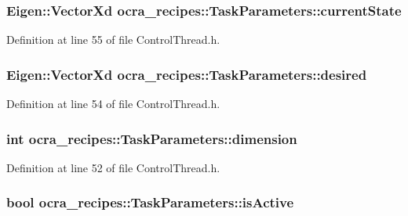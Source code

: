 \subsubsection[{\texorpdfstring{current\+State}{currentState}}]{\setlength{\rightskip}{0pt plus 5cm}Eigen\+::\+Vector\+Xd ocra\+\_\+recipes\+::\+Task\+Parameters\+::current\+State}\hypertarget{classocra__recipes_1_1TaskParameters_a323bf15f03055fcbf07f865ba9074381}{}\label{classocra__recipes_1_1TaskParameters_a323bf15f03055fcbf07f865ba9074381}


Definition at line 55 of file Control\+Thread.\+h.

\subsubsection[{\texorpdfstring{desired}{desired}}]{\setlength{\rightskip}{0pt plus 5cm}Eigen\+::\+Vector\+Xd ocra\+\_\+recipes\+::\+Task\+Parameters\+::desired}\hypertarget{classocra__recipes_1_1TaskParameters_a1dbe7dbb189079f4c8b7cd8f60a3b33e}{}\label{classocra__recipes_1_1TaskParameters_a1dbe7dbb189079f4c8b7cd8f60a3b33e}


Definition at line 54 of file Control\+Thread.\+h.

\subsubsection[{\texorpdfstring{dimension}{dimension}}]{\setlength{\rightskip}{0pt plus 5cm}int ocra\+\_\+recipes\+::\+Task\+Parameters\+::dimension}\hypertarget{classocra__recipes_1_1TaskParameters_a9102d4eee6b4dedb4bfb9181d348ed9c}{}\label{classocra__recipes_1_1TaskParameters_a9102d4eee6b4dedb4bfb9181d348ed9c}


Definition at line 52 of file Control\+Thread.\+h.

\subsubsection[{\texorpdfstring{is\+Active}{isActive}}]{\setlength{\rightskip}{0pt plus 5cm}bool ocra\+\_\+recipes\+::\+Task\+Parameters\+::is\+Active}\hypertarget{classocra__recipes_1_1TaskParameters_a1e4df01753f82bc359f9632817e61e2b}{}\label{classocra__recipes_1_1TaskParameters_a1e4df01753f82bc359f9632817e61e2b}


